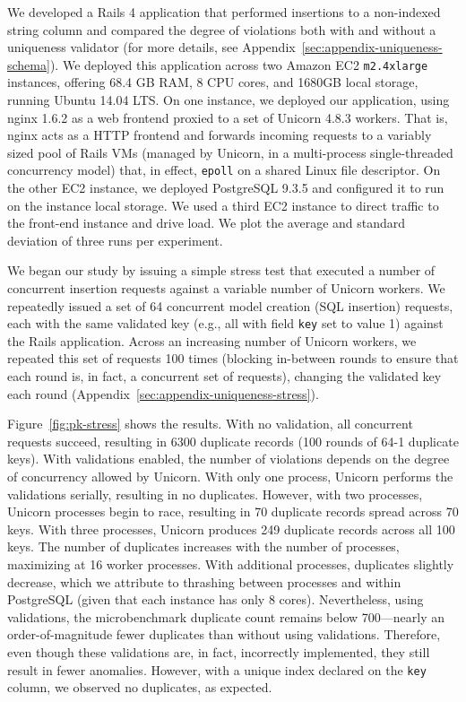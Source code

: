  We developed a Rails 4 application that
performed insertions to a non-indexed string column and compared the
degree of violations both with and without a uniqueness validator (for
more details, see Appendix~\ref{sec:appendix-uniqueness-schema}). We
deployed this application across two Amazon EC2 \texttt{m2.4xlarge}
instances, offering 68.4 GB RAM, 8 CPU cores, and 1680GB local
storage, running Ubuntu 14.04 LTS. On one instance, we deployed our
application, using nginx 1.6.2 as a web frontend proxied to a set of
Unicorn 4.8.3 workers. That is, nginx acts as a HTTP frontend and
forwards incoming requests to a variably sized pool of Rails VMs
(managed by Unicorn, in a multi-process single-threaded concurrency
model) that, in effect, \texttt{epoll} on a shared Linux file
descriptor. On the other EC2 instance, we deployed PostgreSQL 9.3.5
and configured it to run on the instance local storage. We used a
third EC2 instance to direct traffic to the front-end instance and
drive load. We plot the average and standard deviation of three runs
per experiment.

 We began our study by issuing a simple stress
test that executed a number of concurrent insertion requests against a
variable number of Unicorn workers. We repeatedly issued a set of 64
concurrent model creation (SQL insertion) requests, each with the same
validated key (e.g., all with field \texttt{key} set to value 1)
against the Rails application. Across an increasing number of Unicorn
workers, we repeated this set of requests 100 times (blocking
in-between rounds to ensure that each round is, in fact, a concurrent
set of requests), changing the validated key each round
(Appendix~\ref{sec:appendix-uniqueness-stress}).

Figure~\ref{fig:pk-stress} shows the results. With no validation, all
concurrent requests succeed, resulting in 6300 duplicate records (100
rounds of 64-1 duplicate keys). With validations enabled, the number
of violations depends on the degree of concurrency allowed by
Unicorn. With only one process, Unicorn performs the validations
serially, resulting in no duplicates. However, with two processes,
Unicorn processes begin to race, resulting in 70 duplicate records
spread across 70 keys. With three processes, Unicorn produces 249
duplicate records across all 100 keys. The number of duplicates
increases with the number of processes, maximizing at 16 worker
processes. With additional processes, duplicates slightly decrease,
which we attribute to thrashing between processes and within
PostgreSQL (given that each instance has only 8 cores). Nevertheless,
using validations, the microbenchmark duplicate count remains below
700---nearly an order-of-magnitude fewer duplicates than without using
validations. Therefore, even though these validations are, in fact,
incorrectly implemented, they still result in fewer
anomalies. However, with a unique index declared on the \texttt{key}
column, we observed no duplicates, as expected.


